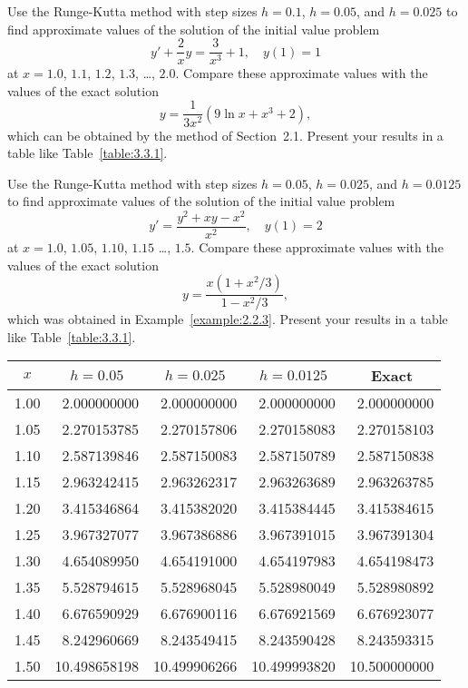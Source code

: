 \documentclass{ximera}
\begin{document}
\begin{problem}\label{exer:3.3.7} 
Use the Runge-Kutta method with step sizes $h=0.1$, $h=0.05$, and
$h=0.025$ to find approximate values of the solution of the initial
value problem
$$
y'+\frac{2}{x}y=\frac{3}{x^3}+1,\quad y(1)=1
$$
at $x=1.0$, $1.1$, $1.2$, $1.3$, \dots, $2.0$. Compare these approximate
values
with the values of the exact solution
$$
y=\frac{1}{3x^2}(9\ln x+x^3+2),
$$
which can be obtained by the method of Section~2.1. Present
your results in a table like Table~\ref{table:3.3.1}.
\end{problem}

\begin{problem}\label{exer:3.3.8} 
Use the Runge-Kutta method with step sizes $h=0.05$, $h=0.025$, and
$h=0.0125$ to find approximate values of the solution of the initial
value problem
$$
y'=\frac{y^2+xy-x^2}{x^2},\quad y(1)=2
$$
at $x=1.0$, $1.05$, $1.10$, $1.15$ \dots, $1.5$. Compare these approximate
values
with the values of the exact solution
$$
y=\frac{x(1+x^2/3)}{1-x^2/3},
$$
which was obtained in Example~\ref{example:2.2.3}. Present your results in
a table like Table~\ref{table:3.3.1}.

\begin{solution}
    {\small
\begin{tabular}{|c|r|r|r|r|}\hline
\multicolumn{1}{|c|}{$x$}&
\multicolumn{1}{|c|}{$h=0.05$}&
\multicolumn{1}{|c|}{$h=0.025$}&
\multicolumn{1}{|c|}{$h=0.0125$}&
\multicolumn{1}{|c|}{Exact}\\ \hline
1.00 &  2.000000000 &  2.000000000 &  2.000000000 &  2.000000000 \\
1.05 &  2.270153785 &  2.270157806 &  2.270158083 &  2.270158103 \\
1.10 &  2.587139846 &  2.587150083 &  2.587150789 &  2.587150838 \\
1.15 &  2.963242415 &  2.963262317 &  2.963263689 &  2.963263785 \\
1.20 &  3.415346864 &  3.415382020 &  3.415384445 &  3.415384615 \\
1.25 &  3.967327077 &  3.967386886 &  3.967391015 &  3.967391304 \\
1.30 &  4.654089950 &  4.654191000 &  4.654197983 &  4.654198473 \\
1.35 &  5.528794615 &  5.528968045 &  5.528980049 &  5.528980892 \\
1.40 &  6.676590929 &  6.676900116 &  6.676921569 &  6.676923077 \\
1.45 &  8.242960669 &  8.243549415 &  8.243590428 &  8.243593315 \\
1.50 & 10.498658198 & 10.499906266 & 10.499993820 & 10.500000000 \\
\hline
\end{tabular}}
\end{solution}
\end{problem}
\end{document}
